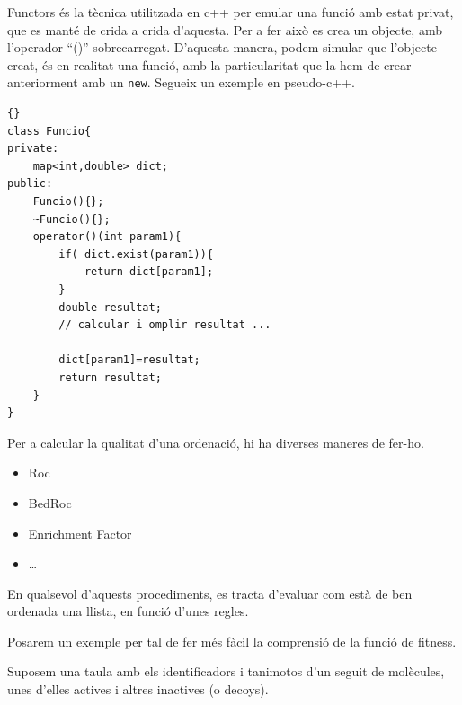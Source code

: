 \documentclass[titlepage,a4paper,12pt]{book}
\begin{document}
Functors és la tècnica utilitzada en c++ per emular una funció amb estat privat,
que es manté de crida a crida d'aquesta.  Per a fer això es crea un objecte, amb
l'operador ``()'' sobrecarregat.  D'aquesta manera, podem simular que l'objecte
creat, és en realitat una funció, amb la particularitat que la hem de crear
anteriorment amb un \texttt{new}.  Segueix un exemple en pseudo-c++.



\lstset{language=c++,
	tabsize=2}
\lstset{commentstyle=\textit}

\begin{lstlisting}[frame=trbl]{}
class Funcio{
private:
	map<int,double> dict;
public:
	Funcio(){};
	~Funcio(){};
	operator()(int param1){
		if( dict.exist(param1)){
			return dict[param1];
		}
		double resultat;
		// calcular i omplir resultat ...

		dict[param1]=resultat;
		return resultat;
	}
}

\end{lstlisting}


Per a calcular la qualitat d'una ordenació, hi ha diverses maneres de fer-ho.

\begin{itemize}
	\item Roc
	\item BedRoc
	\item Enrichment Factor
	\item \dots
\end{itemize}


En qualsevol d'aquests procediments, es tracta d'evaluar com està de ben ordenada una llista, en funció d'unes regles.

Posarem un exemple per tal de fer més fàcil la comprensió de la funció de
fitness.

Suposem una taula amb els identificadors i tanimotos d'un seguit de molècules,
unes d'elles actives i altres inactives (o decoys).


\end{document}
